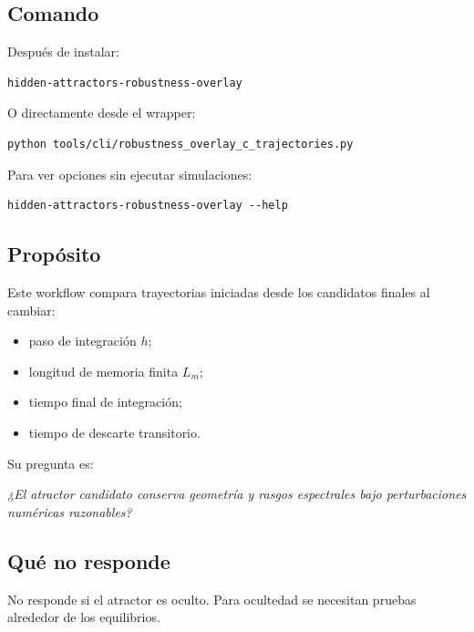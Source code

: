 \documentclass[11pt,letterpaper]{article}
\begin{document}
\subsection{Comando}

Después de instalar:

\begin{lstlisting}[style=terminal]
hidden-attractors-robustness-overlay
\end{lstlisting}

O directamente desde el wrapper:

\begin{lstlisting}[style=terminal]
python tools/cli/robustness_overlay_c_trajectories.py
\end{lstlisting}

Para ver opciones sin ejecutar simulaciones:

\begin{lstlisting}[style=terminal]
hidden-attractors-robustness-overlay --help
\end{lstlisting}

\subsection{Propósito}

Este workflow compara trayectorias iniciadas desde los candidatos finales al cambiar:

\begin{itemize}
  \item paso de integración $h$;
  \item longitud de memoria finita $L_m$;
  \item tiempo final de integración;
  \item tiempo de descarte transitorio.
\end{itemize}

Su pregunta es:

\begin{center}
\textit{¿El atractor candidato conserva geometría y rasgos espectrales bajo perturbaciones numéricas razonables?}
\end{center}

\subsection{Qué no responde}

No responde si el atractor es oculto. Para ocultedad se necesitan pruebas alrededor de los equilibrios.
\end{document}
